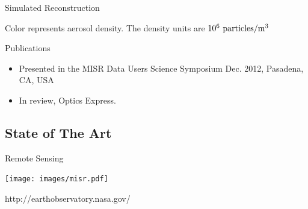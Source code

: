 \documentclass[compress,red,12pt]{beamer}
\begin{document}

\begin{frame}{Simulated Reconstruction}
  \begin{center}
  \end{center}
  \begin{center}
    \tiny{Color represents aerosol density. The density units are $10^{6}~{\rm particles}/{\rm m}^3$}
  \end{center}
\end{frame}


\begin{frame}{}
\end{frame}


\begin{frame}{}
  \begin{center}
    \begin{block}{Publications}
      \begin{itemize}
      \item Presented in the MISR Data Users Science Symposium Dec. 2012, Pasadena, CA, USA
      \item In review, Optics Express.
      \end{itemize}
    \end{block}
  \end{center}
\end{frame}


\subsection{State of The Art}


\begin{frame}{Remote Sensing}
  \begin{center}
    \texttt{[image: images/misr.pdf]}
  \end{center}
  \begin{flushright}
    {\tiny http://earthobservatory.nasa.gov/}
  \end{flushright}
  {
  }
\end{frame}
\end{document}
